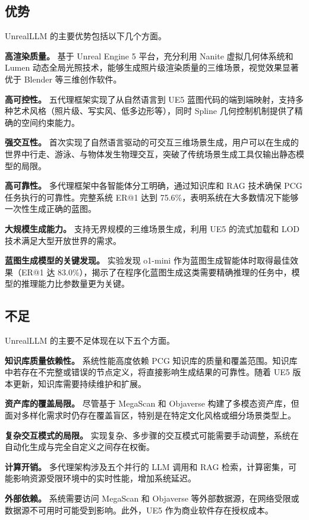 \documentclass[a4paper]{article}
\begin{document}
\subsection{优势}

UnrealLLM 的主要优势包括以下几个方面。

\textbf{高渲染质量。} 基于 Unreal Engine 5 平台，充分利用 Nanite 虚拟几何体系统和 Lumen 动态全局光照技术，能够生成照片级渲染质量的三维场景，视觉效果显著优于 Blender 等三维创作软件。

\textbf{高可控性。} 五代理框架实现了从自然语言到 UE5 蓝图代码的端到端映射，支持多种艺术风格（照片级、写实风、低多边形等），同时 Spline 几何控制机制提供了精确的空间约束能力。

\textbf{强交互性。} 首次实现了自然语言驱动的可交互三维场景生成，用户可以在生成的世界中行走、游泳、与物体发生物理交互，突破了传统场景生成工具仅输出静态模型的局限。

\textbf{高可靠性。} 多代理框架中各智能体分工明确，通过知识库和 RAG 技术确保 PCG 任务执行的可靠性。完整系统 ER@1 达到 75.6\%，表明系统在大多数情况下能够一次性生成正确的蓝图。

\textbf{大规模生成能力。} 支持无界规模的三维场景生成，利用 UE5 的流式加载和 LOD 技术满足大型开放世界的需求。

\textbf{蓝图生成模型的关键发现。} 实验发现 o1-mini 作为蓝图生成智能体时取得最佳效果（ER@1 达 83.0\%），揭示了在程序化蓝图生成这类需要精确推理的任务中，模型的推理能力比参数量更为关键。

\subsection{不足}

UnrealLLM 的主要不足体现在以下五个方面。

\textbf{知识库质量依赖性。} 系统性能高度依赖 PCG 知识库的质量和覆盖范围。知识库中若存在不完整或错误的节点定义，将直接影响生成结果的可靠性。随着 UE5 版本更新，知识库需要持续维护和扩展。

\textbf{资产库的覆盖局限。} 尽管基于 MegaScan 和 Objaverse 构建了多模态资产库，但面对多样化需求时仍存在覆盖盲区，特别是在特定文化风格或细分场景类型上。

\textbf{复杂交互模式的局限。} 实现复杂、多步骤的交互模式可能需要手动调整，系统在自动化生成与完全自定义之间存在权衡。

\textbf{计算开销。} 多代理架构涉及五个并行的 LLM 调用和 RAG 检索，计算密集，可能影响资源受限环境中的实时性能，增加系统延迟。

\textbf{外部依赖。} 系统需要访问 MegaScan 和 Objaverse 等外部数据源，在网络受限或数据源不可用时可能受到影响。此外，UE5 作为商业软件存在授权成本。
\end{document}
